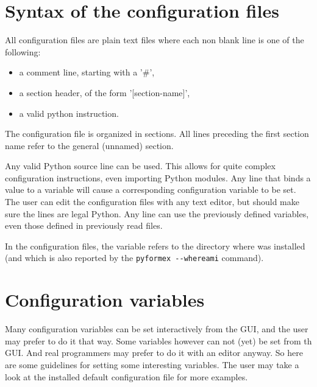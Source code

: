 \section{Syntax of the configuration files}
\label{sec:syntax-conf-files}


All configuration files are plain text files where each non blank line is one of the following:
\begin{itemize}
\item a comment line, starting with a '\#',
\item a section header, of the form '[section-name]',
\item a valid python instruction.
\end{itemize}

The configuration file is organized in sections. All lines preceding the first section name refer to the general (unnamed) section. 

Any valid Python source line can be used. This allows for quite complex configuration instructions, even importing Python modules. Any line that binds a value to a variable will cause a corresponding configuration variable to be set. The user can edit the configuration files with any text editor, but should make sure the lines are legal Python. Any line can use the previously defined variables, even those defined in previously read files.

In the configuration files, the variable  refers to the directory where \pyf was installed (and which is also reported by the \verb|pyformex --whereami| command).  


\section{Configuration variables}
\label{sec:conf-vars}
Many configuration variables can be set interactively from the GUI, and the user may prefer to do it that way. Some variables however can not (yet) be set from th GUI. And real programmers may prefer to do it with an editor anyway. So here are some guidelines for setting some interesting variables. The user may take a look at the installed \pyf default configuration file for more examples.

